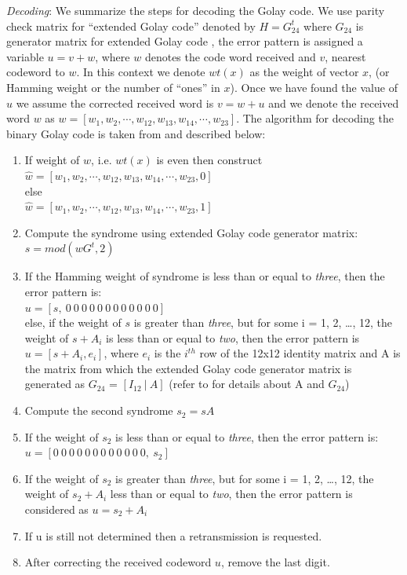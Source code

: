 \emph{Decoding}: We summarize the steps for decoding the Golay code. We use parity check matrix for ``extended Golay code'' denoted by $H = G^t_{24}$ where $G_{24}$ is generator matrix for extended Golay code \cite{golay}, the error pattern is assigned a variable $u = v + w$, where $w$ denotes the code word received and $v$, nearest codeword to $w$. In this context we denote $wt(x)$ as the weight of vector $x$, (or Hamming weight or the number of ``ones'' in $x$). Once we have found the value of $u$ we assume the
corrected received word is $v = w + u$ and we denote the received word $w$ as $w = [w_1, w_2, \cdots , w_{12}, w_{13}, w_{14}, \cdots , w_{23}]$. The algorithm for decoding the binary Golay code is taken from \cite{golay} and described below:
\begin{enumerate}
	\item If weight of $w$, i.e. $wt(x)$ is even then construct\\
		\tab $\hat{w} = [ w_1, w_2, \cdots , w_{12}, w_{13}, w_{14}, \cdots , w_{23}, 0]$\\
		  else\\
		\tab $\hat{w} = [ w_1, w_2, \cdots , w_{12}, w_{13}, w_{14}, \cdots , w_{23}, 1]$\\
	\item Compute the syndrome using extended Golay code generator matrix:\\
		\tab \tab \tab \tab $s = mod(wG^t, 2)$
	\item If the Hamming weight of syndrome is less than or equal to \emph{three}, then the error pattern is:\\
		\tab \tab \tab $u = [s,\  0\  0\  0\  0\  0\  0\  0\  0\  0\  0\  0\  0]$\\
		else, if the weight of $s$ is greater than \emph{three}, but for some i = 1, 2, \ldots, 12, the weight of $s + A_i$ is less than or equal to \emph{two}, then the error pattern is $u = [ s + A_i, e_i]$, where $e_i$ is the $i^{th}$ row of the 12x12 identity matrix and A is the matrix from which the extended Golay code generator matrix is generated as $G_{24}$ = $[I_{12}\:|\:A]$ (refer to \cite{golay} for details about A and $G_{24}$)
	\item Compute the second  syndrome $s_2 = s A$
	\item If the weight of $s_2$ is less than or equal to \emph{three}, then the error pattern is:\\
		\tab \tab \tab $u = [ 0\  0\  0\  0\  0\  0\  0\  0\  0\  0\  0\  0,\ s_2]$
	\item If the weight of $s_2$ is greater than \emph{three}, but for some i = 1, 2, \ldots, 12, the weight of $s_2 + A_i$ less than or equal to \emph{two}, then the error pattern is considered as $u = s_2 + A_i$
	\item If u is still not determined then a retransmission is requested.

	\item After correcting the received codeword $u$, remove the last digit.
\end{enumerate}

